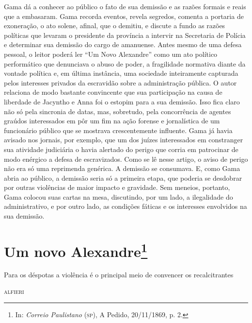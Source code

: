 {\small\noindent
Gama dá a conhecer ao público o fato de sua demissão e as razões
formais e reais que a embasaram. Gama recorda eventos, revela segredos,
comenta a portaria de exoneração, o ato solene, afinal, que o demitiu, e
discute a fundo as razões políticas que levaram o presidente da
província a intervir na Secretaria de Polícia e determinar sua demissão
do cargo de amanuense. Antes mesmo de uma defesa pessoal, o leitor
poderá ler ``Um Novo Alexandre'' como um ato político performático que
denunciava o abuso de poder, a fragilidade normativa diante da vontade
política e, em última instância, uma sociedade inteiramente capturada
pelos interesses privados da escravidão sobre a administração pública. O
autor relaciona de modo bastante convincente que sua participação na
causa de liberdade de Jacyntho e Anna foi o estopim para a sua demissão.
Isso fica claro não só pela sincronia de datas, mas, sobretudo, pela
concorrência de agentes graúdos
interessados em pôr um fim na ação forense e jornalística de um
funcionário público que se mostrava crescentemente influente. Gama já
havia avisado nos jornais, por exemplo, que um dos juízes interessados
em constranger sua atividade judiciária o havia alertado do perigo que
corria em patrocinar de modo enérgico a defesa de escravizados. Como se
lê nesse artigo, o aviso de perigo não era só uma reprimenda genérica. A
demissão se consumava. E, como Gama abria ao público, a demissão seria
só a primeira etapa, que poderia se desdobrar por outras violências de
maior impacto e gravidade. Sem meneios, portanto, Gama colocou suas
cartas na mesa, discutindo, por um lado, a ilegalidade do
administrativo, e por outro lado, as condições fáticas e os interesses
envolvidos na sua demissão. }

\chapter{Um novo Alexandre\footnote[*]{In: \emph{Correio Paulistano}
  (\textsc{sp}), A Pedido, 20/11/1869, p. 2.}}

\epigraph{Para os déspotas a violência é o principal meio de convencer os
recalcitrantes}{\textsc{alfieri}\footnotemark}

